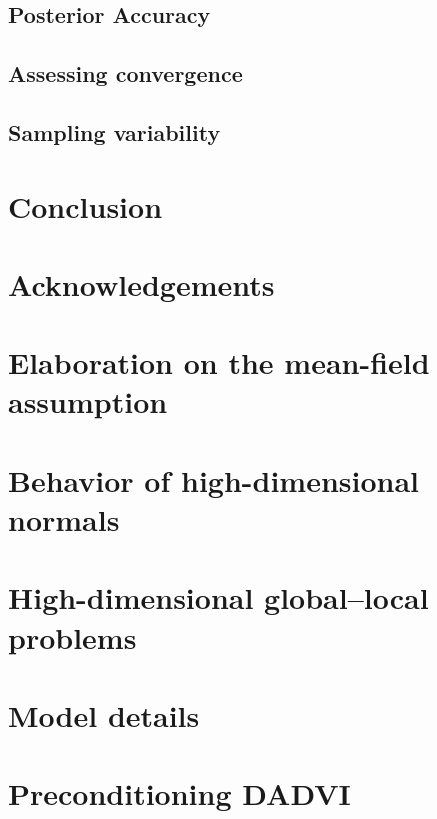 \documentclass[twoside,11pt]{article}
\begin{document}
\subsection{Posterior Accuracy}\label{sec:experiments_posterior_accuracy}


\subsection{Assessing convergence}\label{sec:experiments_convergence}


\subsection{Sampling variability} \label{sec:experiments_sampling_variability}




\section{Conclusion}


\section{Acknowledgements}



\newpage


\newpage
\appendix

\section{Elaboration on the mean-field assumption}\label{app:mean-field}


\section{Behavior of high-dimensional normals}\label{app:high_dim_normal}


\section{High-dimensional global--local problems}\label{app:high_dim_global_local}


\section{Model details}\label{app:model-details}


\section{Preconditioning DADVI}\label{app:preconditioning}

\end{document}
